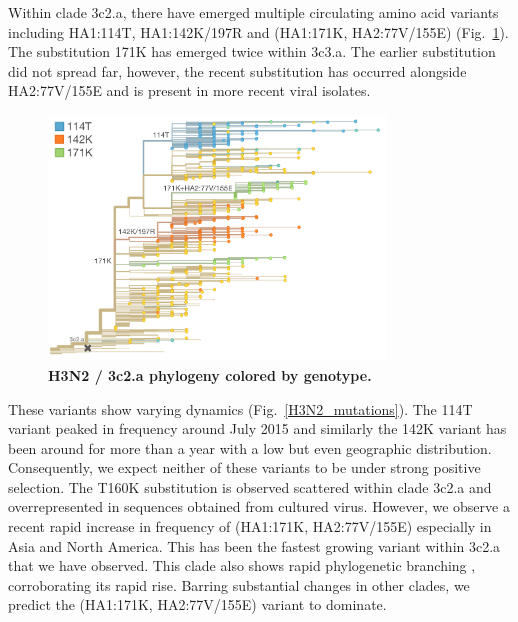 \documentclass[11pt,oneside,letterpaper]{article}
\begin{document}
Within clade 3c2.a, there have emerged multiple circulating amino acid variants including HA1:114T, HA1:142K/197R and (HA1:171K, HA2:77V/155E) (Fig.\ \ref{H3N2_3c2a_tree}). The substitution 171K has emerged twice within 3c3.a. The earlier substitution did not spread far, however, the recent substitution has occurred alongside HA2:77V/155E and is present in more recent viral isolates.

\begin{figure}[h!]
	\centering		
	\includegraphics[width=0.8\textwidth]{../figures/feb-2016/H3N2_3c2a_tree.png}
	\caption{\textbf{H3N2 / 3c2.a phylogeny colored by genotype.} 
	}
	\label{H3N2_3c2a_tree}
\end{figure}

These variants show varying dynamics (Fig.\ \ref{H3N2_mutations}). The 114T variant peaked in frequency around July 2015 and similarly the 142K variant has been around for more than a year with a low but even geographic distribution. Consequently, we expect neither of these variants to be under strong positive selection. The T160K substitution is observed scattered within clade 3c2.a and overrepresented in sequences obtained from cultured virus. However, we observe a recent rapid increase in frequency of (HA1:171K, HA2:77V/155E) especially in Asia and North America. This has been the fastest growing variant within 3c2.a that we have observed. This clade also shows rapid phylogenetic branching \cite{neher2014predicting}, corroborating its rapid rise. Barring substantial changes in other clades, we predict the (HA1:171K, HA2:77V/155E) variant to dominate.
\end{document}
